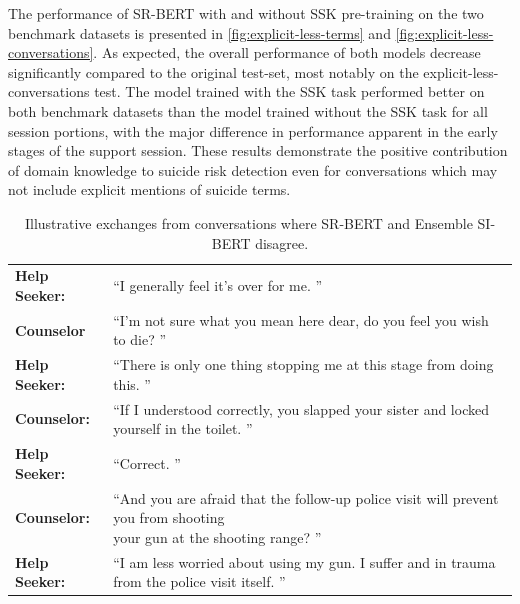 \documentclass[letterpaper]{article} %
\begin{document}

The performance of SR-BERT with and without SSK pre-training  on the two benchmark datasets is presented in \autoref{fig:explicit-less-terms} and \autoref{fig:explicit-less-conversations}. As expected, the overall performance of both models decrease significantly compared to the original test-set, most notably on the explicit-less-conversations test. The model trained with the SSK task performed better on both benchmark datasets  than the model trained without the SSK task for all session portions, with the major difference in performance apparent in the early stages of the support session. These results demonstrate the positive contribution of domain knowledge to suicide risk detection even for conversations which may not include explicit mentions of suicide terms.
\begin{table}[]
\caption{Illustrative exchanges from conversations where SR-BERT and Ensemble SI-BERT disagree.}
\centering
\begin{tabular}{ll}
\hline
\textbf{Help Seeker:}  &  ``I generally feel it’s over for me. ''                                                      \\
\textbf{Counselor} & ``I’m not sure what you mean here dear, do you feel  you wish to die? '' \\
\textbf{Help Seeker:}  & ``There is only one thing stopping me at this stage from doing this.    ''                  \\
\hline
\hline
\textbf{Counselor:} &
``If I understood correctly, you slapped your sister and locked yourself in the toilet. ''\\
\textbf{Help Seeker:} & ``Correct. ''
\\
\textbf{Counselor:} & \makecell[l]{
``And you are afraid that the follow-up police visit will prevent you from shooting \\ your gun at the shooting range? ''}
\\
\textbf{Help Seeker:} &
``I am less worried about using my gun. I suffer and in trauma from the police visit itself. ''
\\ \hline
\end{tabular}
\label{tab:examples}

\end{table}
\end{document}
